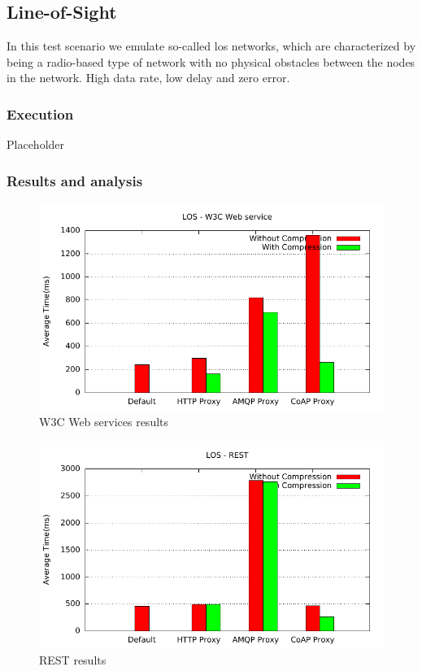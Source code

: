 \subsection{Line-of-Sight}

In this test scenario we emulate so-called \gls{los} networks, which are
characterized by being a radio-based type of network with no physical obstacles
between the nodes in the network. High data rate, low delay and zero error.

\subsubsection{Execution}
Placeholder

\subsubsection{Results and analysis}

\begin{figure}[H]
\center
\includegraphics[scale=0.75]{../results/los/nffi/out.pdf}
\caption{W3C Web services results}
\end{figure}

\begin{figure}[H]
\center
\includegraphics[scale=0.75]{../results/los/rest/out.pdf}
\caption{REST results}
\end{figure}

